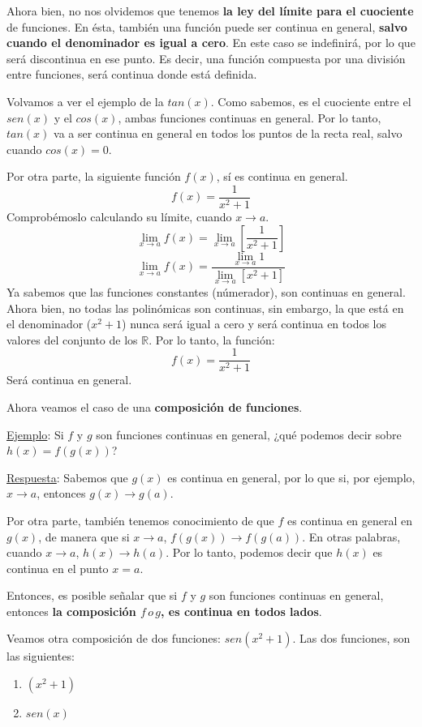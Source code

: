 \documentclass[12pt]{article}
\begin{document}
Ahora bien, no nos olvidemos que tenemos \textbf{la ley del límite para el cuociente} de funciones. En ésta, también una función puede ser continua en general, \textbf{salvo cuando el denominador es igual a cero}. En este caso se indefinirá, por lo que será discontinua en ese punto. Es decir, una función compuesta por una división entre funciones, será continua donde está definida.

Volvamos a ver el ejemplo de la $tan(x)$. Como sabemos, es el cuociente entre el $sen(x)$ y el $cos(x)$, ambas funciones continuas en general. Por lo tanto, $tan(x)$ va a ser continua en general en todos los puntos de la recta real, salvo cuando $cos(x) = 0$.

Por otra parte, la siguiente función $f(x)$, sí es continua en general.
\[f(x) = \frac{1}{x^{2}+1}\]
Comprobémoslo calculando su límite, cuando $x \to a$.
\[\lim_{x \to a} f(x) = \lim_{x \to a} \left[\frac{1}{x^{2}+1}\right]\]
\[\lim_{x \to a} f(x) = \frac{\lim_{x \to a} 1}{\lim_{x \to a} [x^{2} + 1]}\]
Ya sabemos que las funciones constantes (númerador), son continuas en general. Ahora bien, no todas las polinómicas son continuas, sin embargo, la que está en el denominador ($x^{2} + 1$) nunca será igual a cero y será continua en todos los valores del conjunto de los $\mathbb{R}$. Por lo tanto, la función:
\[f(x) = \frac{1}{x^{2}+1}\]
Será continua en general.

Ahora veamos el caso de una \textbf{composición de funciones}. 

\underline{Ejemplo}: Si $f$ y $g$ son funciones continuas en general, ¿qué podemos decir sobre $h(x) = f(g(x))$?

\underline{Respuesta}: Sabemos que $g(x)$ es continua en general, por lo que si, por ejemplo, $x \to a$, entonces $g(x) \to g(a)$.

Por otra parte, también tenemos conocimiento de que $f$ es continua en general en $g(x)$, de manera que si $x \to a$, $f(g(x)) \to f(g(a))$. En otras palabras, cuando $x \to a$, $h(x) \to h(a)$. Por lo tanto, podemos decir que $h(x)$ es continua en el punto $x = a$.

Entonces, es posible señalar que si $f$ y $g$ son funciones continuas en general, entonces \textbf{la composición $f \, o \, g$, es continua en todos lados}.

Veamos otra composición de dos funciones: $sen(x^{2} + 1)$. Las dos funciones, son las siguientes:
\begin{enumerate}
\item $(x^{2} + 1)$
\item $sen(x)$
\end{enumerate}
\end{document}
